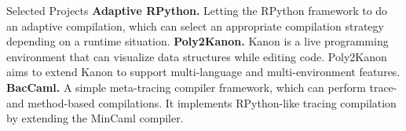 \begin{rubric}{Selected Projects}
  \entry*[2021-] \textbf{Adaptive RPython.} Letting the RPython framework to do an
  adaptive compilation, which can select an appropriate compilation strategy
  depending on a runtime situation.
  \entry*[2020-] \textbf{Poly2Kanon.} Kanon is a live programming environment that can
  visualize data structures while editing code. Poly2Kanon aims to extend Kanon to
  support multi-language and multi-environment features.
  \entry*[2019-2020] \textbf{BacCaml.} A simple meta-tracing compiler framework,
  which can perform trace- and method-based compilations. It implements RPython-like
  tracing compilation by extending the MinCaml compiler.
\end{rubric}
